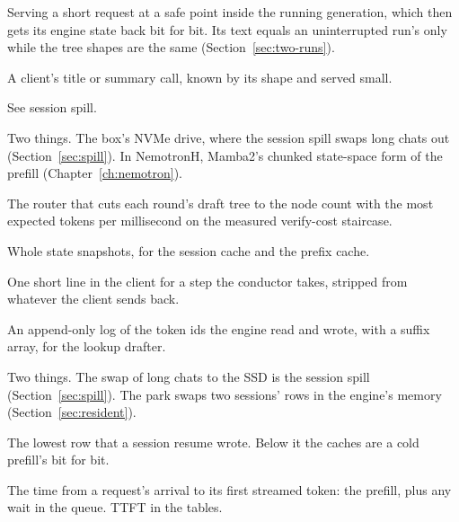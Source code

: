 \begin{description}[style=unboxed, leftmargin=0pt, itemsep=.5ex, font=\normalfont\bfseries]
\item[side lane] Serving a short request at a safe point inside the running generation, which then gets its engine state back bit for bit. Its text equals an uninterrupted run's only while the tree shapes are the same (Section~\ref{sec:two-runs}).

\item[side request] A client's title or summary call, known by its shape and served small.

\item[spill] See session spill.

\item[SSD] Two things. The box's NVMe drive, where the session spill swaps long chats out (Section~\ref{sec:spill}). In NemotronH, Mamba2's chunked state-space form of the prefill (Chapter~\ref{ch:nemotron}).

\item[StairCut] The router that cuts each round's draft tree to the node count with the most expected tokens per millisecond on the measured verify-cost staircase.

\item[state store] Whole state snapshots, for the session cache and the prefix cache.

\item[status line] One short line in the client for a step the conductor takes, stripped from whatever the client sends back.

\item[suffix store] An append-only log of the token ids the engine read and wrote, with a suffix array, for the lookup drafter.

\item[swap] Two things. The swap of long chats to the SSD is the session spill (Section~\ref{sec:spill}). The park swaps two sessions' rows in the engine's memory (Section~\ref{sec:resident}).

\item[taint] The lowest row that a session resume wrote. Below it the caches are a cold prefill's bit for bit.

\item[time to first token] The time from a request's arrival to its first streamed token: the prefill, plus any wait in the queue. TTFT in the tables.


\end{description}
